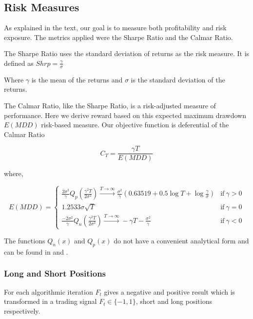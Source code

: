 \documentclass[parskip=full]{scrartcl}
\begin{document}
\subsection{Risk Measures}

As explained in the text, our goal is to measure both profitability and risk exposure. The metrics applied were the Sharpe Ratio and the Calmar Ratio.

The Sharpe Ratio uses the standard deviation of returns as the risk measure.
It is defined as $ Shrp = \frac{\gamma}{\sigma}$

Where $\gamma$ is the mean of the returns and $\sigma$ is the standard deviation of the returns.

The Calmar Ratio, like the Sharpe Ratio, is a risk-adjusted measure of performance. Here we derive reward based on this expected maximum drawdown $E(MDD)$ risk-based measure.
Our objective function is deferential of the Calmar Ratio

$$ C_T = \frac{\gamma T}{E(MDD)} $$

where,

\begin{equation*}
E(MDD) = 
	\begin{cases}
		\frac{2\sigma^2}{\gamma}Q_p(\frac{\gamma^2T}{2\sigma^2}) \xrightarrow{T \to \infty}  \frac{\sigma^2}{\gamma}(0.63519 + 0.5\log T + \log\frac{\gamma}{\sigma}) & \text{if}\ \gamma > 0\\ 
		     
		1.2533\sigma \sqrt{T} & \text{if}\ \gamma = 0\\
		
		\frac{-2\sigma^2}{\gamma}Q_n(\frac{\gamma^2T}{2\sigma^2}) \xrightarrow{T \to \infty} -\gamma T - \frac{\sigma^2}{\gamma} & \text{if}\ \gamma < 0
	\end{cases}
\end{equation*}

The functions $Q_n(x)$ and $Q_p(x)$ do not have a convenient analytical form and can be found in \cite{pratap2004maximum} and \cite{magdon2004maximum}.

\subsubsection{Long and Short Positions}

For each algorithmic iteration $ F_t$ gives a negative and positive result which is transformed in a trading signal $F_t \in \{-1,1\}$, short and long positions respectively.
\end{document}
